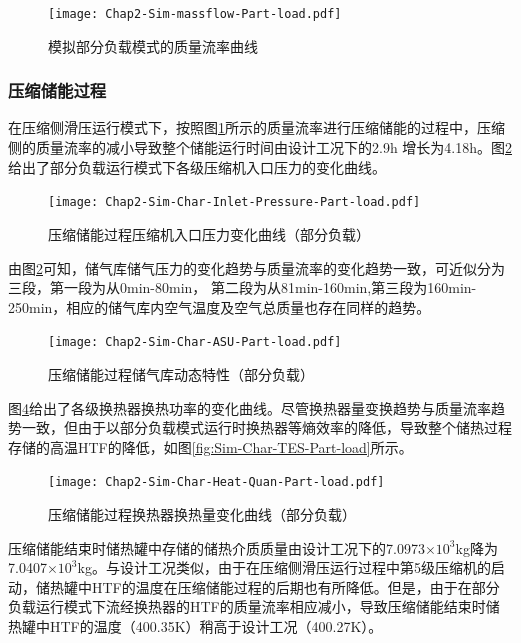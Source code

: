 \begin{figure}[H] %
  \centering
  \texttt{[image: Chap2-Sim-massflow-Part-load.pdf]}
  \caption{模拟部分负载模式的质量流率曲线}
  \label{fig:Sim-massflow-Part-load}
\end{figure}

\subsubsection{压缩储能过程}
在压缩侧滑压运行模式下，按照图\ref{fig:Sim-massflow-Part-load}所示的质量流率进行压缩储能的过程中，压缩侧的质量流率的减小导致整个储能运行时间由设计工况下的2.9h 增长为4.18h。图\ref{fig:Sim-Char-Inlet-Pressure-Part-load}给出了部分负载运行模式下各级压缩机入口压力的变化曲线。

\begin{figure}[H] %
  \centering
  \texttt{[image: Chap2-Sim-Char-Inlet-Pressure-Part-load.pdf]}
  \caption{压缩储能过程压缩机入口压力变化曲线（部分负载）}
  \label{fig:Sim-Char-Inlet-Pressure-Part-load}
\end{figure}

由图\ref{fig:Sim-Char-Inlet-Pressure-Part-load}可知，储气库储气压力的变化趋势与质量流率的变化趋势一致，可近似分为三段，第一段为从0min-80min， 第二段为从81min-160min,第三段为160min-250min，相应的储气库内空气温度及空气总质量也存在同样的趋势。

\begin{figure}[H] %
  \centering
  \texttt{[image: Chap2-Sim-Char-ASU-Part-load.pdf]}
  \caption{压缩储能过程储气库动态特性（部分负载）}
  \label{fig:Sim-Char-ASU-Part-load}
\end{figure}

图\ref{fig:Sim-Char-Heat-Quan-Part-load}给出了各级换热器换热功率的变化曲线。尽管换热器量变换趋势与质量流率趋势一致，但由于以部分负载模式运行时换热器等熵效率的降低，导致整个储热过程存储的高温HTF的降低，如图\ref{fig:Sim-Char-TES-Part-load}所示。

\begin{figure}[H] %
  \centering
  \texttt{[image: Chap2-Sim-Char-Heat-Quan-Part-load.pdf]}
  \caption{压缩储能过程换热器换热量变化曲线（部分负载）}
  \label{fig:Sim-Char-Heat-Quan-Part-load}
\end{figure}

压缩储能结束时储热罐中存储的储热介质质量由设计工况下的7.0973$\times 10^3$kg降为7.0407$\times 10^3$kg。与设计工况类似，由于在压缩侧滑压运行过程中第5级压缩机的启动，储热罐中HTF的温度在压缩储能过程的后期也有所降低。但是，由于在部分负载运行模式下流经换热器的HTF的质量流率相应减小，导致压缩储能结束时储热罐中HTF的温度（400.35K）稍高于设计工况（400.27K）。

